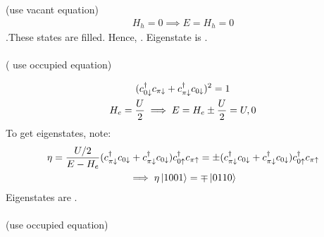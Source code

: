 \documentclass[12pt]{article}
\begin{document}
 (use vacant equation)
\begin{gather}
H_h = 0
\implies E = H_h = 0
\end{gather}
.These states are filled. Hence, . Eigenstate is \il{\ket{\da,\da}}.\\\\
 ( use occupied equation)

\begin{gather}
	(c^\dagger_{0\downarrow}c_{\pi\downarrow}+c^\dagger_{\pi\downarrow}c_{0\downarrow})^2=1\\
	H_e = \frac{U}{2}
	\implies E = H_e \pm \frac{U}{2} = U,0
\end{gather}
To get eigenstates, note:
\begin{gather}
\eta = \frac{U/2}{E-H_e}(c^\dagger_{\pi\downarrow}c_{0\downarrow}+c^\dagger_{\pi\downarrow}c_{0\downarrow}) c^\dagger_{0\uparrow}c_{\pi\uparrow} = \pm(c^\dagger_{\pi\downarrow}c_{0\downarrow}+c^\dagger_{\pi\downarrow}c_{0\downarrow}) c^\dagger_{0\uparrow}c_{\pi\uparrow}\\
\implies \eta \ket{1001} = \mp \ket{0110}
\end{gather}
Eigenstates  are \il{\ket{\ua,\da}\pm\ket{\da,\ua}}.\\\\
 (use occupied equation)
\end{document}
